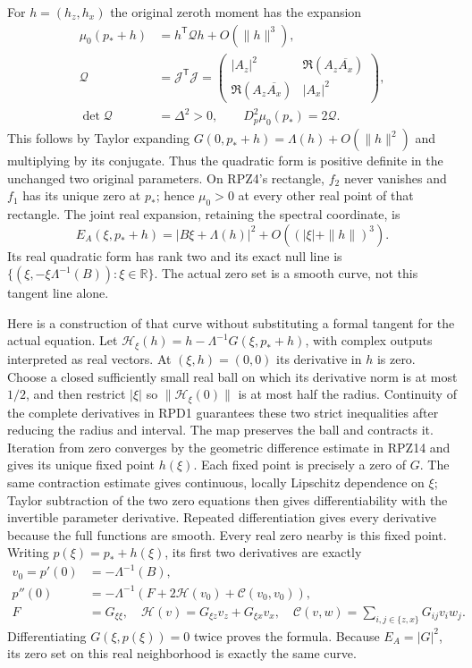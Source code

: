 \documentclass[11pt]{article}
\begin{document}
For $h=(h_z,h_x)$ the original zeroth moment has the expansion
\[
 \begin{aligned}
 \mu_0(p_*+h)&=h^{\mathsf T}\mathcal Qh+O(\|h\|^3),\\
 \mathcal Q&=\mathcal J^{\mathsf T}\mathcal J
 =\begin{pmatrix}|A_z|^2&\Re(A_z\overline{A_x})\\
                 \Re(A_z\overline{A_x})&|A_x|^2\end{pmatrix},\\
 \det\mathcal Q&=\Delta^2>0,
 \qquad D_p^2\mu_0(p_*)=2\mathcal Q.
 \end{aligned}\tag{RPD5}
\]
This follows by Taylor expanding $G(0,p_*+h)=\Lambda(h)+O(\|h\|^2)$
and multiplying by its conjugate.  Thus the quadratic form is positive
definite in the unchanged two original parameters.  On RPZ4's
rectangle, $f_2$ never vanishes and $f_1$ has its unique zero at $p_*$;
hence $\mu_0>0$ at every other real point of that rectangle.
The joint real expansion, retaining the spectral coordinate, is
\[
 E_A(\xi,p_*+h)=|B\xi+\Lambda(h)|^2
                 +O((|\xi|+\|h\|)^3).\tag{RPD6}
\]
Its real quadratic form has rank two and its exact null line is
$\{(\xi,-\xi\Lambda^{-1}(B)):\xi\in\mathbb R\}$.
The actual zero set is a smooth curve, not this tangent line alone.

Here is a construction of that curve without substituting a formal
tangent for the actual equation.  Let
$\mathcal H_\xi(h)=h-\Lambda^{-1}G(\xi,p_*+h)$, with complex outputs
interpreted as real vectors.  At $(\xi,h)=(0,0)$ its derivative in
$h$ is zero.  Choose a closed sufficiently small real ball on which
its derivative norm is at most $1/2$, and then restrict $|\xi|$ so
$\|\mathcal H_\xi(0)\|$ is at most half the radius.  Continuity of
the complete derivatives in RPD1 guarantees these two strict
inequalities after reducing the radius and interval.  The map
preserves the ball and contracts it.  Iteration from zero converges
by the geometric difference estimate in RPZ14 and gives its unique
fixed point $h(\xi)$.  Each fixed point is precisely a zero of $G$.
The same contraction estimate gives continuous, locally Lipschitz
dependence on $\xi$; Taylor subtraction of the two zero equations
then gives differentiability with the invertible parameter derivative.
Repeated differentiation gives every derivative because the full
functions are smooth.  Every real zero nearby is this fixed point.
Writing $p(\xi)=p_*+h(\xi)$, its first two derivatives are exactly
\[
 \begin{aligned}
 v_0=p'(0)&=-\Lambda^{-1}(B),\\
 p''(0)&=-\Lambda^{-1}\left(F+2\mathcal H(v_0)+\mathcal C(v_0,v_0)\right),\\
 F&=G_{\xi\xi},\quad
 \mathcal H(v)=G_{\xi z}v_z+G_{\xi x}v_x,\quad
 \mathcal C(v,w)=\sum_{i,j\in\{z,x\}}G_{ij}v_iw_j.
 \end{aligned}\tag{RPD7}
\]
Differentiating $G(\xi,p(\xi))=0$ twice proves the formula.  Because
$E_A=|G|^2$, its zero set on this real neighborhood is exactly the
same curve.
\end{document}
